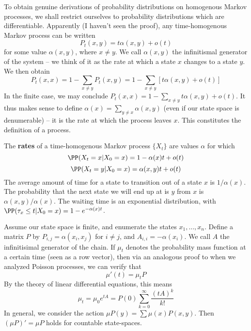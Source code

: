 To obtain genuine derivations of probability distributions on homogenous Markov processes, we shall restrict ourselves to probability distributions which are differentiable. Apparently (I haven't seen the proof), any time-homogenous Markov process can be written
%
\[ P_t(x,y) = t \alpha(x,y) + o(t) \]
%
for some value $\alpha(x,y)$, where $x \neq y$. We call $\alpha(x,y)$ the infinitismal generator of the system -- we think of it as the rate at which a state $x$ changes to a state $y$. We then obtain
%
\[ P_t(x,x) = 1 - \sum_{x \neq y} P_t(x,y) = 1 - \sum_{x \neq y} [t \alpha(x,y) + o(t)] \]
%
In the finite case, we may conclude $P_t(x,x) = 1 - \sum_{x \neq y} t \alpha(x,y) + o(t)$. It thus makes sense to define $\alpha(x) = \sum_{y \neq x} \alpha(x,y)$ (even if our state space is denumerable) -- it is the rate at which the process leaves $x$. This constitutes the definition of a process.

\begin{definition}
    The {\bf rates} of a time-homogenous Markov process $\{ X_t \}$ are values $\alpha$ for which
    \[ \PP(X_t = x | X_0 = x) = 1 - \alpha(x) t + o(t) \]
    \[ \PP(X_t = y | X_0 = x) = \alpha(x,y) t + o(t) \]
    The average amount of time for a state to transition out of a state $x$ is $1/\alpha(x)$. The probability that the next state we will end up at is $y$ from $x$ is $\alpha(x,y)/\alpha(x)$. The waiting time is an exponential distribution, with $\PP(\tau_x \leq t | X_0 = x) = 1 - e^{-\alpha(x)t}$.
\end{definition}

Assume our state space is finite, and enumerate the states $x_1, \dots, x_n$. Define a matrix $P$ by $P_{i,j} = \alpha(x_i, x_j)$ for $i \neq j$, and $A_{i,i} = - \alpha(x_i)$. We call $A$ the infinitisimal generator of the chain. If $\mu_t$ denotes the probability mass function at a certain time (seen as a row vector), then via an analogous proof to when we analyzed Poisson processes, we can verify that
%
\[ \mu'(t) = \mu_t P \]
%
By the theory of linear differential equations, this means
%
\[ \mu_t = \mu_0 e^{tA} = P(0) \sum_{k = 0}^\infty \frac{(tA)^k}{k!} \]
%
In general, we consider the action $\mu P(y) = \sum \mu(x) P(x,y)$. Then $(\mu P)' = \mu P$ holds for countable state-spaces.

